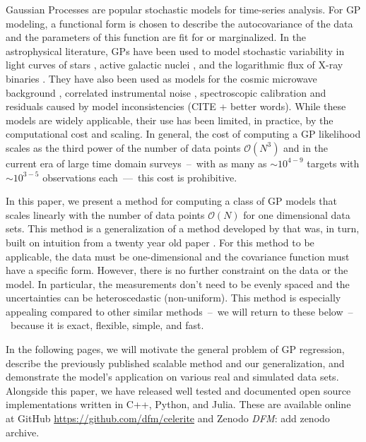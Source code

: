 \documentclass[manuscript, letterpaper]{aastex6}
\makeatletter
\let\origsection\section
\renewcommand\section{\@ifstar{\starsection}{\nostarsection}}
\newcommand\nostarsection[1]{\sectionprelude\origsection{#1}}
\newcommand\starsection[1]{\sectionprelude\origsection*{#1}}
\newcommand\sectionprelude{\vspace{1em}}
\newcommand{\project}[1]{\textsf{#1}}
\newcommand{\todo}[3]{{\color{#2}\emph{#1}: #3}}
\newcommand{\dfmtodo}[1]{\todo{DFM}{red}{#1}}
\makeatother
\begin{document}
\keywords{%
}

\section{Introduction}

Gaussian Processes \citep[GPs;][]{Rasmussen:2006} are popular stochastic
models for time-series analysis.
For GP modeling, a functional form is chosen to describe the autocovariance
of the data and the parameters of this function are fit for or marginalized.
In the astrophysical literature, GPs have been used to model stochastic
variability in light curves of stars \citep{Brewer:2009}, active galactic
nuclei \citep{Kelly:2014}, and the logarithmic flux of X-ray binaries
\citep{Uttley:2005}.
They have also been used as models for the cosmic microwave background
\citep{Bond:1987,Bond:1999}, correlated instrumental noise
\citep{Gibson:2012}, spectroscopic calibration \citep{Czekala:2017,Evans:2015}
and residuals caused by model inconsistencies (CITE + better words).
While these models are widely applicable, their use has been limited, in
practice, by the computational cost and scaling.
In general, the cost of computing a GP likelihood scales as the third power of
the number of data points $\mathcal{O}(N^3)$ and in the current era of large
time domain surveys~--~with as many as $\sim10^{4-9}$ targets with
$\sim10^{3-5}$ observations each~---~this cost is prohibitive.

In this paper, we present a method for computing a class of GP models that
scales linearly with the number of data points $\mathcal{O}(N)$ for one
dimensional data sets.
This method is a generalization of a method developed by
\citet{Ambikasaran:2015} that was, in turn, built on intuition from a twenty
year old paper \citep{Rybicki:1995}.
For this method to be applicable, the data must be one-dimensional and the
covariance function must have a specific form.
However, there is no further constraint on the data or the model.
In particular, the measurements don't need to be evenly spaced and the
uncertainties can be heteroscedastic (non-uniform).
This method is especially appealing compared to other similar methods~--~we
will return to these below~--~because it is exact, flexible, simple, and fast.

In the following pages, we will motivate the general problem of GP regression,
describe the previously published scalable method \citep{Rybicki:1995,
Ambikasaran:2015} and our generalization, and demonstrate the model's
application on various real and simulated data sets.
Alongside this paper, we have released well tested and documented open source
implementations written in \project{C++}, \project{Python}, and
\project{Julia}.
These are available online at \project{GitHub}
\url{https://github.com/dfm/celerite} and \project{Zenodo} \dfmtodo{add zenodo
archive}.
\end{document}
